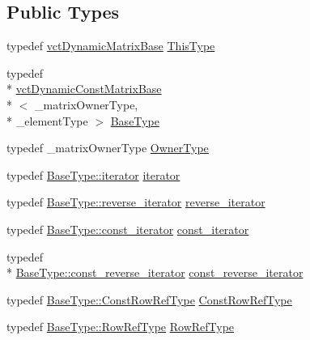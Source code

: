 \subsection*{Public Types}
\begin{DoxyCompactItemize}
\item 
typedef \hyperlink{classvct_dynamic_matrix_base}{vct\-Dynamic\-Matrix\-Base} \hyperlink{classvct_dynamic_matrix_base_afc70802fd7c3e318e8bad4532b945f82}{This\-Type}
\item 
typedef \\*
\hyperlink{classvct_dynamic_const_matrix_base}{vct\-Dynamic\-Const\-Matrix\-Base}\\*
$<$ \-\_\-matrix\-Owner\-Type, \\*
\-\_\-element\-Type $>$ \hyperlink{classvct_dynamic_matrix_base_a6285355f814f82089376c6819d127fd4}{Base\-Type}
\item 
typedef \-\_\-matrix\-Owner\-Type \hyperlink{classvct_dynamic_matrix_base_a224b1f3a25e201d7b45be1da3ac69951}{Owner\-Type}
\item 
typedef \hyperlink{classvct_dynamic_const_matrix_base_aee4b4524b7972fd1b324cba62505a949}{Base\-Type\-::iterator} \hyperlink{classvct_dynamic_matrix_base_a60f380ccdba201f2cec57ec3905b8229}{iterator}
\item 
typedef \hyperlink{classvct_dynamic_const_matrix_base_a53905f35527b9ce433c246ab50a6b812}{Base\-Type\-::reverse\-\_\-iterator} \hyperlink{classvct_dynamic_matrix_base_a5390b4a252fc2e2bbe94cbd19f8c9fa2}{reverse\-\_\-iterator}
\item 
typedef \hyperlink{classvct_dynamic_const_matrix_base_a665b16a8ecd8b6febb4d193efa42205e}{Base\-Type\-::const\-\_\-iterator} \hyperlink{classvct_dynamic_matrix_base_a63eb2ea8f5972efe2f125a8c22b46670}{const\-\_\-iterator}
\item 
typedef \\*
\hyperlink{classvct_dynamic_const_matrix_base_afc30420e745eed5f1c838a01088ddc84}{Base\-Type\-::const\-\_\-reverse\-\_\-iterator} \hyperlink{classvct_dynamic_matrix_base_a98a8a7626647cf9dfef10d6b7f7cc9af}{const\-\_\-reverse\-\_\-iterator}
\item 
typedef \hyperlink{classvct_dynamic_const_matrix_base_a42a300cb1afd5f0602ba5c2d7d9cc40b}{Base\-Type\-::\-Const\-Row\-Ref\-Type} \hyperlink{classvct_dynamic_matrix_base_ab7670bc2e61331e4228b9e9fa6885329}{Const\-Row\-Ref\-Type}
\item 
typedef \hyperlink{classvct_dynamic_const_matrix_base_a15b845e745a76559d730ecef10a991b7}{Base\-Type\-::\-Row\-Ref\-Type} \hyperlink{classvct_dynamic_matrix_base_a32b85f46bce5ec110e29208e241f82c3}{Row\-Ref\-Type}

\end{DoxyCompactItemize}
